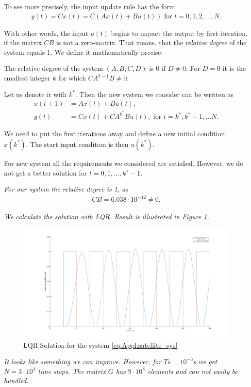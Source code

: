 To see more precisely, the input update rule has the form 
\begin{align}
y(t) = C x(t) = C(A x(t) + B u(t)) \text{ for } t = 0, 1,2, \dots, N. 
\end{align}

With other words, the input $u(t)$ begins to impact the output by first iteration, if the matrix $CB$ is not a zero-matrix. That means, that the \textit{relative degree} of the system equals 1. We define it mathematically precise: 
\begin{defi}
	The relative degree of the system $(A, B, C, D)$ is 0 if $D \neq 0$. For $D = 0$ it is the smallest integer $k$ for which $	C A^{k-1} B \neq 0$.
\end{defi} 
Let us denote it with $k^*$. Then the new system we consider can be written as 
\begin{align}
x(t+1) &= A x(t) + B u(t), \\
y(t) &= C x(t) + C A^{k^*} B u(t),  \text{ for } t = k^*, k^* + 1, \dots N. 
\end{align}

We need to put the first iterations away and define a new initial condition $x(k^*)$. The start input condition is then $u(k^*)$. 

For new system all the requirements we considered are satisfied. However, we do not get a better solution for $t = 0, 1, \dots, k^\star - 1$. 

\begin{example}[continued]
	
\textit{For our system the relative degree is 1, as }
	\begin{align}
	CB = 6.038\cdot 10^{-12} \neq 0. 
	\end{align}
	
\textit{We calculate the solution with LQR. Result is illustrated in Figure \ref{img:Allp:Sat_LQR}.}
	
	\begin{figure}[ht]
		\centering
		\includegraphics[width=\textwidth]{fig/Ex3_LQR.jpg}
		\caption{LQR Solution for the system \eqref{eq:Appl:satellite_sys}}
		\label{img:Allp:Sat_LQR}
	\end{figure}
	
\textit{It looks like something we can improve. However, for $Ts = 10^{-3}$s we get $N = 3\cdot10^4$ time steps. The matrix $G$ has  $9\cdot10^8$ elements and can not easily be handled.}
\end{example}

